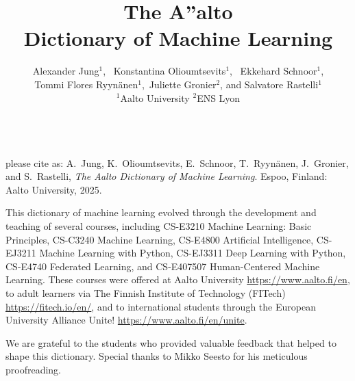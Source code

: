 \documentclass[journal,12pt,onecolumn]{article}
\begin{document}

\title {\vspace*{10mm}
	{\huge {\bf The {\fontsize{40}{48}\selectfont \textbf{\textsf{A\hspace*{-2mm}''}}}\hspace*{-4mm}alto \\ Dictionary of Machine Learning}}  \\[-5mm] 
	
}





\author{\hspace{-2mm}Alexander Jung${}^{1}$, \ Konstantina Olioumtsevits${}^{1}$, \ 
	Ekkehard Schnoor${}^{1}$, \\[-2mm] Tommi Flores Ryynänen${}^{1}$,\ 
	Juliette Gronier${}^{2}$, and Salvatore Rastelli${}^{1}$ \\[-2mm]
	${}^{1}$Aalto University \quad ${}^{2}$ENS Lyon
}

\maketitle
	\begin{center}
		\\[10mm]

{\large	please cite as: A.\ Jung, K.\ Olioumtsevits, E.\ Schnoor, T.\ Ryynänen, J.\ Gronier, and S.\ Rastelli, \textit{The Aalto Dictionary of Machine Learning}. Espoo, Finland: Aalto University, 2025.}
\end{center}

\newpage 
{}

\noindent This dictionary of machine learning evolved through the development 
and teaching of several courses, including CS-E3210 Machine Learning: Basic Principles, 
CS-C3240 Machine Learning, CS-E4800 Artificial Intelligence, CS-EJ3211 Machine Learning with Python, 
CS-EJ3311 Deep Learning with Python, CS-E4740 Federated Learning, and 
CS-E407507 Human-Centered Machine Learning. These courses were offered at 
Aalto University \url{https://www.aalto.fi/en}, to adult learners via 
The Finnish Institute of Technology (FITech) \url{https://fitech.io/en/}, and to international 
students through the European University Alliance Unite! \url{https://www.aalto.fi/en/unite}.

\noindent We are grateful to the students who provided valuable feedback that helped 
to shape this dictionary. Special thanks to Mikko Seesto for his meticulous proofreading.
\end{document}

